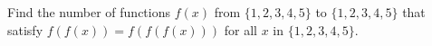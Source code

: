 Find the number of functions $f(x)$ from $\{1,2,3,4,5\}$ to $\{1,2,3,4,5\}$ that satisfy $f(f(x)) = f(f(f(x)))$ for all $x$ in $\{1,2,3,4,5\}$.